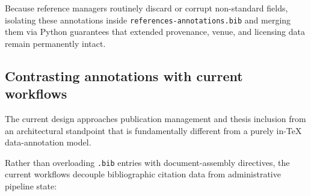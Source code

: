 \documentclass[12pt, twoside]{article}
\newcommand{\fname}[1]{\texttt{#1}}
\begin{document}
Because reference managers routinely discard or corrupt non-standard fields, isolating these annotations inside \fname{references-annotations.bib} and merging them via Python guarantees that extended provenance, venue, and licensing data remain permanently intact.

\subsection{Contrasting annotations with current workflows}
\label{sec:contrastingAnnotationsWithCurrentWorkflows}
The current design approaches publication management and thesis inclusion from an architectural standpoint that is fundamentally different from a purely in-\TeX{} data-annotation model.

Rather than overloading \fname{.bib} entries with document-assembly directives, the current workflows decouple bibliographic citation data from administrative pipeline state:
\end{document}
